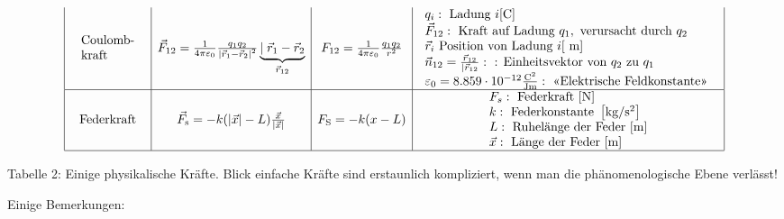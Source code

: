 \begin{center}
\begin{equation*}
\begin{array}{|c|c|c|c|}
\begin{array}{l}
\text { Coulomb- } \\
\text { kraft }
\end{array} & \vec{F}_{12}=\frac{1}{4 \pi \varepsilon_0} \frac{q_1 q_2}{\left|\vec{r}_1-\vec{r}_2\right|^2} \underbrace{\mid \vec{r}_1-\vec{r}_2}_{\vec{r}_{12}} & F_{12}=\frac{1}{4 \pi \varepsilon_0} \frac{q_1 q_2}{r^2} & \begin{array}{l}
q_i: \text { Ladung } i[\mathrm{C}] \\
\vec{F}_{12}: \text { Kraft auf Ladung } q_1, \text { verursacht durch } q_2 \\
\vec{r}_i \text { Position von Ladung } i[\mathrm{~m}] \\
\vec{n}_{12}=\frac{\vec{r}_{12}}{\mid \vec{r}_{12}}: \text { : Einheitsvektor von } q_2 \text { zu } q_1 \\
\varepsilon_0=8.859 \cdot 10^{-12} \frac{\mathrm{C}^2}{\mathrm{Jm}}: \text { «Elektrische Feldkonstante» }
\end{array} \\
\hline \text { Federkraft } & \vec{F}_{\mathrm{s}}=-k(|\vec{x}|-L) \frac{\vec{x}}{|\vec{x}|} & F_{\mathrm{S}}=-k(x-L) & \begin{array}{l}
F_s: \text { Federkraft }[\mathrm{N}] \\
k: \text { Federkonstante }\left[\mathrm{kg} / \mathrm{s}^2\right] \\
L: \text { Ruhelänge der Feder }[\mathrm{m}] \\
\vec{x}: \text { Länge der Feder }[\mathrm{m}]
\end{array} \\
\hline
\end{array}
\end{equation*}
\end{center}

Tabelle 2: Einige physikalische Kräfte.
 Blick einfache Kräfte sind erstaunlich kompliziert, wenn man die phänomenologische Ebene verlässt!

Einige Bemerkungen:

